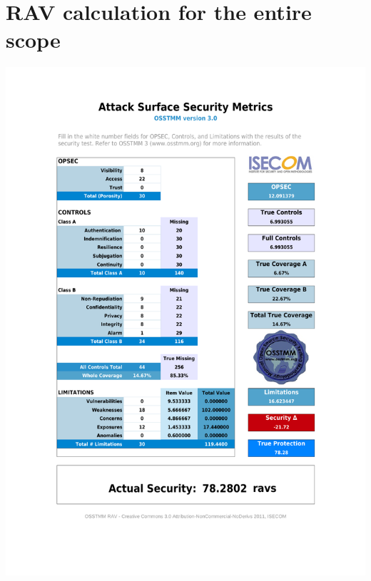 \documentclass[10pt,a4paper,twoside,onecolumn]{article}
\begin{document}
\section{RAV calculation for the entire scope}
\includegraphics[width=\textwidth,trim=84pt 110pt 84pt 140pt,clip=true]{data/global.pdf}
\end{document}

